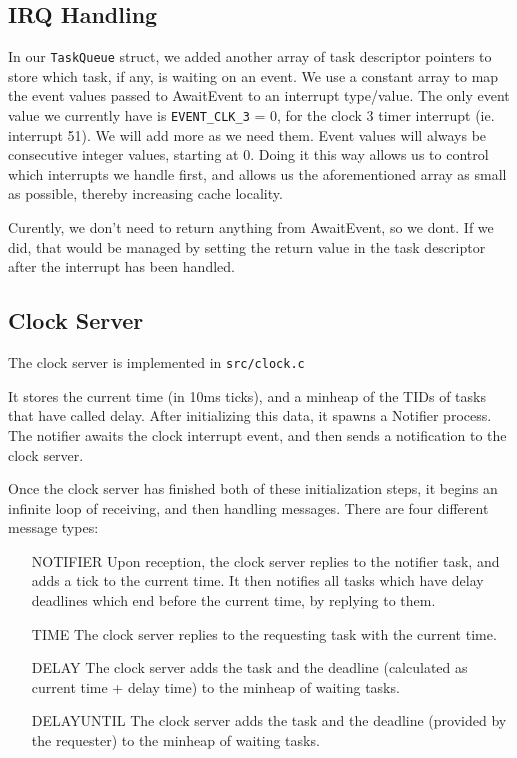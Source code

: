 \documentclass{article}
\begin{document}
\subsection{IRQ Handling}
In our \verb|TaskQueue| struct, we added another array of task descriptor pointers to store which task, if any, is waiting on an event.
We use a constant array to map the event values passed to AwaitEvent to an interrupt type/value. The only event value we currently have is \verb|EVENT_CLK_3| = 0, for the clock 3 timer interrupt (ie. interrupt 51). We will add more as we need them. Event values will always be consecutive integer values, starting at 0. Doing it this way allows us to control which interrupts we handle first, and allows us the aforementioned array as small as possible, thereby increasing cache locality.

Curently, we don't need to return anything from AwaitEvent, so we dont. If we did, that would be managed by setting the return value in the task descriptor after the interrupt has been handled.
\subsection{Clock Server}
The clock server is implemented in \verb|src/clock.c|

It stores the current time (in 10ms ticks), and a minheap of the TIDs of tasks that have called delay.
After initializing this data, it spawns a Notifier process. 
The notifier awaits the clock interrupt event, and then sends a notification to the clock server.

Once the clock server has finished both of these initialization steps, it begins an infinite loop of receiving, and then handling messages.
There are four different message types:
\begin{enumerate}
    \item[NOTIFIER] Upon reception, the clock server replies to the notifier task, and adds a tick to the current time.
    It then notifies all tasks which have delay deadlines which end before the current time, by replying to them.
    \item [TIME] The clock server replies to the requesting task with the current time.
    \item[DELAY] The clock server adds the task and the deadline (calculated as current time + delay time) to the minheap of waiting tasks.
    \item[DELAYUNTIL] The clock server adds the task and the deadline (provided by the requester) to the minheap of waiting tasks.
\end{enumerate}
\end{document}
